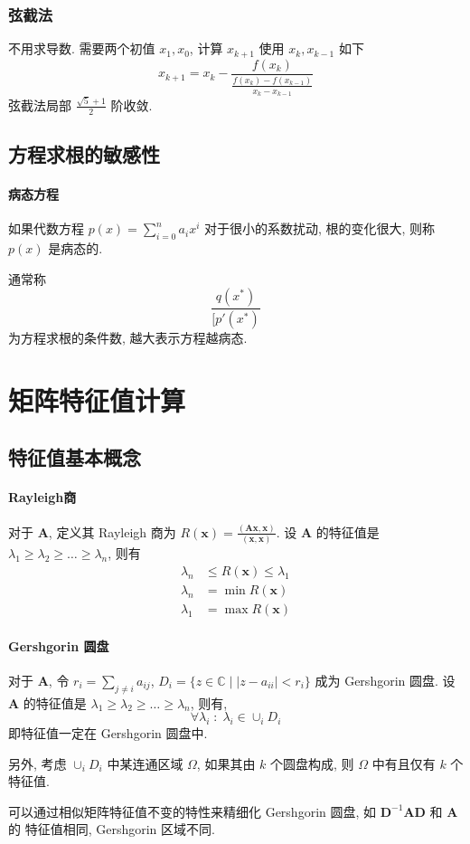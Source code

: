 \documentclass{ctexart}
\newcommand{\Cset}{\mathbb{C}}
\begin{document}
\subsubsection{弦截法}
    不用求导数.
    需要两个初值 $x_1, x_0$, 计算 $x_{k+1}$ 使用 $x_k, x_{k-1}$ 如下 \[
        x_{k+1} = x_k - \frac{f(x_k)}{\frac{f(x_k) - f(x_{k-1})}{x_k - x_{k-1}}}\]
    弦截法局部 $\frac{\sqrt{5}+1}{2}$ 阶收敛.

\subsection{方程求根的敏感性}
\paragraph{病态方程}
    如果代数方程 $p(x) = \sum_{i=0}^n a_i x^i$ 对于很小的系数扰动,
    根的变化很大, 则称 $p(x)$ 是病态的.\par
    通常称\[
        \frac{q(x^*)}{[p'(x^*)}\]
    为方程求根的条件数, 越大表示方程越病态.


\section{矩阵特征值计算}
\subsection{特征值基本概念}
\paragraph{Rayleigh商}
    对于 $\mathbf{A}$, 定义其 Rayleigh 商为
    $R(\mathbf{x}) = \frac{(\mathbf{A} \mathbf{x} , \mathbf{x} )}{(\mathbf{x} ,\mathbf{x} )}$.
    设 $\mathbf{A}$ 的特征值是 $\lambda_1 \ge \lambda_2 \ge \ldots \ge \lambda_n$,
    则有 \begin{align*}
        \lambda_n &\le R(\mathbf{x} ) \le \lambda_1 \\
        \lambda_n &= \min R(\mathbf{x})\\
        \lambda_1 &= \max R(\mathbf{x})
    \end{align*}
\paragraph{Gershgorin 圆盘}
    对于 $\mathbf{A}$, 令 $r_i = \sum_{j \neq i} a_{ij}$,
    $D_i = \{z \in \Cset \;|\; |z - a_{ii}| < r_i\}$ 成为 Gershgorin 圆盘.
    设 $\mathbf{A}$ 的特征值是 $\lambda_1 \ge \lambda_2 \ge \ldots \ge \lambda_n$,
    则有, \[\forall \lambda_i\;:\; \lambda_i \in \cup_i D_i\]
    即特征值一定在 Gershgorin 圆盘中.\par
    另外, 考虑 $\cup_i D_i$ 中某连通区域 $\Omega$, 如果其由 $k$ 个圆盘构成,
    则 $\Omega$ 中有且仅有 $k$ 个特征值.\par
    可以通过相似矩阵特征值不变的特性来精细化 Gershgorin 圆盘,
    如 $ \mathbf{D}^{-1} \mathbf{A} \mathbf{D} $ 和 $\mathbf{A} $ 的 特征值相同,
    Gershgorin 区域不同.
\end{document}

